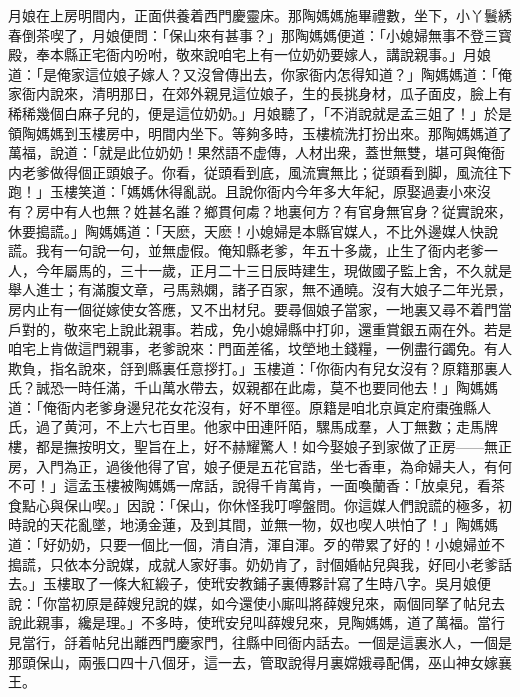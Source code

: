 月娘在上房明間内，正面供養着西門慶靈床。那陶媽媽施畢禮數，坐下，小丫鬟綉春倒茶喫了，月娘便問：「保山來有甚事？」那陶媽媽便道：「小媳婦無事不登三寳殿，奉本縣正宅衙内吩咐，敬來說咱宅上有一位奶奶要嫁人，講說親事。」月娘道：「是俺家這位娘子嫁人？又沒曾傳出去，你家衙内怎得知道？」陶媽媽道：「俺家衙内說來，清明那日，在郊外親見這位娘子，生的長挑身材，瓜子面皮，臉上有稀稀幾個白麻子兒的，便是這位奶奶。」月娘聽了，「不消說就是孟三姐了！」於是領陶媽媽到玉樓房中，明間内坐下。等夠多時，玉樓梳洗打扮出來。那陶媽媽道了萬福，說道：「就是此位奶奶！果然語不虚傳，人材出衆，蓋世無雙，堪可與俺衙内老爹做得個正頭娘子。你看，従頭看到底，風流實無比；従頭看到脚，風流往下跑！」玉樓笑道：「媽媽休得亂説。且說你衙内今年多大年紀，原娶過妻小來沒有？房中有人也無？姓甚名誰？鄉貫何䖏？地裏何方？有官身無官身？従實說來，休要搗謊。」陶媽媽道：「天麽，天麽！小媳婦是本縣官媒人，不比外邊媒人快說謊。我有一句說一句，並無虚假。俺知縣老爹，年五十多歲，止生了衙内老爹一人，今年屬馬的，三十一歲，正月二十三日辰時建生，現做國子監上舍，不久就是舉人進士；有滿腹文章，弓馬熟嫻，諸子百家，無不通曉。沒有大娘子二年光景，房内止有一個従嫁使女答應，又不出材兒。要尋個娘子當家，一地裏又尋不着門當戶對的，敬來宅上說此親事。若成，免小媳婦縣中打卯，還重賞銀五兩在外。若是咱宅上肯做這門親事，老爹說來：門面差徭，坟塋地土錢糧，一例盡行蠲免。有人欺負，指名說來，㧱到縣裏任意拶打。」玉樓道：「你衙内有兒女沒有？原籍那裏人氏？誠恐一時任滿，千山萬水帶去，奴親都在此䖏，莫不也要同他去！」陶媽媽道：「俺衙内老爹身邊兒花女花沒有，好不單徑。原籍是咱北京眞定府棗強縣人氏，過了黄河，不上六七百里。他家中田連阡陌，騾馬成羣，人丁無數；走馬牌樓，都是撫按明文，聖旨在上，好不赫耀驚人！如今娶娘子到家做了正房——無正房，入門為正，過後他得了官，娘子便是五花官誥，坐七香車，為命婦夫人，有何不可！」這孟玉樓被陶媽媽一席話，說得千肯萬肯，一面喚蘭香：「放桌兒，看茶食點心與保山喫。」因說：「保山，你休怪我叮嚀盤問。你這媒人們說謊的極多，初時說的天花亂墜，地湧金蓮，及到其間，並無一物，奴也喫人哄怕了！」陶媽媽道：「好奶奶，只要一個比一個，清自清，渾自渾。歹的帶累了好的！小媳婦並不搗謊，只依本分說媒，成就人家好事。奶奶肯了，討個婚帖兒與我，好囘小老爹話去。」玉樓取了一條大紅緞子，使玳安教鋪子裏傅夥計寫了生時八字。吳月娘便說：「你當初原是薛嫂兒說的媒，如今還使小廝叫將薛嫂兒來，兩個同拏了帖兒去說此親事，纔是理。」不多時，使玳安兒叫薛嫂兒來，見陶媽媽，道了萬福。當行見當行，㧱着帖兒出離西門慶家門，往縣中囘衙内話去。一個是這裏氷人，一個是那頭保山，兩張口四十八個牙，這一去，管取說得月裏嫦娥尋配偶，巫山神女嫁襄王。

